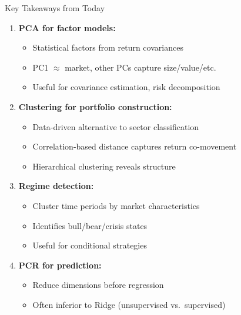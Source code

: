 \documentclass[10pt]{beamer}
\begin{document}
\begin{frame}{Key Takeaways from Today}

  \begin{enumerate}
    \item \textbf{PCA for factor models:}
    \begin{itemize}
      \item Statistical factors from return covariances
      \item PC1 $\approx$ market, other PCs capture size/value/etc.
      \item Useful for covariance estimation, risk decomposition
    \end{itemize}

    \vspace{0.5em}
    \item \textbf{Clustering for portfolio construction:}
    \begin{itemize}
      \item Data-driven alternative to sector classification
      \item Correlation-based distance captures return co-movement
      \item Hierarchical clustering reveals structure
    \end{itemize}

    \vspace{0.5em}
    \item \textbf{Regime detection:}
    \begin{itemize}
      \item Cluster time periods by market characteristics
      \item Identifies bull/bear/crisis states
      \item Useful for conditional strategies
    \end{itemize}

    \vspace{0.5em}
    \item \textbf{PCR for prediction:}
    \begin{itemize}
      \item Reduce dimensions before regression
      \item Often inferior to Ridge (unsupervised vs.\ supervised)
    \end{itemize}
  \end{enumerate}
\end{frame}

\end{document}

